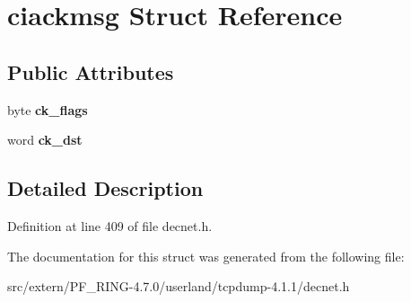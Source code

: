 \hypertarget{structciackmsg}{
\section{ciackmsg Struct Reference}
\label{structciackmsg}
}
\subsection*{Public Attributes}
\begin{DoxyCompactItemize}
\item 
\hypertarget{structciackmsg_a70f9236fa2a9870d2de9fd2371e81769}{
byte {\bfseries ck\_\-flags}}
\label{structciackmsg_a70f9236fa2a9870d2de9fd2371e81769}

\item 
\hypertarget{structciackmsg_aebf67a96fc76b4c78dd624a87ead49e3}{
word {\bfseries ck\_\-dst}}
\label{structciackmsg_aebf67a96fc76b4c78dd624a87ead49e3}

\end{DoxyCompactItemize}


\subsection{Detailed Description}


Definition at line 409 of file decnet.h.



The documentation for this struct was generated from the following file:\begin{DoxyCompactItemize}
\item 
src/extern/PF\_\-RING-\/4.7.0/userland/tcpdump-\/4.1.1/decnet.h\end{DoxyCompactItemize}
